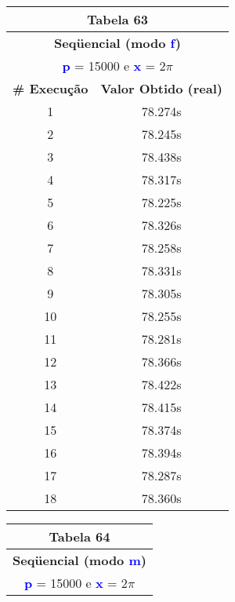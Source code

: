 \documentclass[11pt]{article}
\begin{document}
\begin{table}[!h]
	\begin{center}
		\begin{minipage}{0.48\textwidth}
			\begin{tabular}{| c | c |}
			\hline
			\multicolumn{2}{|c|}{\textbf{Tabela 63}} \\ \hline
			\multicolumn{2}{|c|}{\textbf{Seqüencial (modo \textbf{\textcolor{blue}{f}})}} \\
			\multicolumn{2}{|c|}{\textbf{\textcolor{blue}{p}} = 15000 e \textbf{\textcolor{blue}{x}} = $2\pi$} \\ [0.2ex]
			\hline
				\textbf{\# Execução} &  \textbf{Valor Obtido (real)} \\ \hline
				1 & 78.274s \\ \hline
				2 & 78.245s \\ \hline
				3 & 78.438s \\ \hline
				4 & 78.317s \\ \hline
				5 & 78.225s \\ \hline
				6 & 78.326s \\ \hline
				7 & 78.258s \\ \hline
				8 & 78.331s \\ \hline
				9 & 78.305s \\ \hline
				10 & 78.255s \\ \hline
				11 & 78.281s \\ \hline
				12 & 78.366s \\ \hline
				13 & 78.422s \\ \hline
				14 & 78.415s \\ \hline
				15 & 78.374s \\ \hline
				16 & 78.394s \\ \hline
				17 & 78.287s \\ \hline
				18 & 78.360s \\ \hline
			\end{tabular}
		\end{minipage}
		\begin{minipage}{0.48\textwidth}
			\begin{tabular}{| c | c |}
			\hline
			\multicolumn{2}{|c|}{\textbf{Tabela 64}} \\ \hline
			\multicolumn{2}{|c|}{\textbf{Seqüencial (modo \textbf{\textcolor{blue}{m}})}} \\
			\multicolumn{2}{|c|}{\textbf{\textcolor{blue}{p}} = 15000 e \textbf{\textcolor{blue}{x}} = $2\pi$} \\ [0.2ex]
			\hline

\end{tabular}
\end{minipage}
\end{center}
\end{table}
\end{document}
